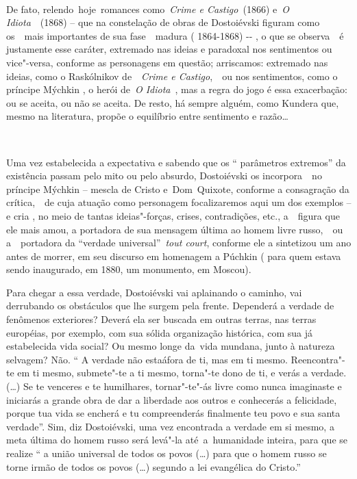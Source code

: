 ~

De fato, relendo~hoje~romances como~\emph{Crime e Castigo~}(1866)
e~\emph{O Idiota}~~(1868) -- que na constelação de obras de Dostoiévski
figuram como os~~mais importantes de sua fase~~madura ( 1864-1868) -\/-
, o que se observa~~é justamente esse caráter, extremado nas ideias e
paradoxal nos sentimentos ou vice"-versa, conforme as personagens em
questão; arriscamos: extremado nas ideias, como o Raskólnikov
de~~\emph{Crime e Castigo},~\emph{~}ou nos sentimentos, como o príncipe
Mýchkin , o herói de~\emph{O Idiota}~, mas a regra do jogo é essa
exacerbação: ou se aceita, ou não se aceita. De resto, há sempre alguém,
como Kundera que, mesmo na literatura, propõe o equilíbrio entre
sentimento e razão\ldots{}

~

Uma vez estabelecida a expectativa e sabendo que os `` parâmetros
extremos'' da existência passam pelo mito ou pelo absurdo, Dostoiévski
os incorpora~~no príncipe Mýchkin -- mescla de Cristo e~Dom~Quixote,
conforme a consagração da crítica,~~de cuja atuação como personagem
focalizaremos aqui um dos exemplos -- e cria , no meio de tantas
ideias"-forças, crises, contradições, etc., a~~figura que ele mais amou,
a portadora de sua mensagem última ao homem livre russo,~~ou
a~~portadora da ``verdade universal''~\emph{tout court}, conforme ele a
sintetizou um ano antes de morrer, em seu discurso em homenagem a
Púchkin ( para quem estava sendo inaugurado, em 1880, um monumento, em
Moscou).

Para chegar a essa verdade, Dostoiévski vai aplainando o caminho, vai
derrubando os obstáculos que lhe surgem pela frente. Dependerá a verdade
de fenômenos exteriores? Deverá ela ser buscada em outras terras, nas
terras européias, por exemplo, com sua sólida organização histórica, com
sua já estabelecida vida social? Ou mesmo longe da~vida mundana, junto à
natureza selvagem? Não. `` A verdade não estaáfora de ti, mas em ti
mesmo. Reencontra"-te em ti mesmo, submete"-te a ti mesmo, torna"-te dono
de ti, e verás a verdade. (\ldots{}) Se te venceres e te humilhares,
tornar"-te"-ás livre como nunca imaginaste e iniciarás a grande obra de
dar a liberdade aos outros e conhecerás a felicidade, porque tua vida se
encherá e tu compreenderás finalmente teu povo e sua santa verdade''.
Sim, diz Dostoiévski, uma vez encontrada a verdade em si mesmo, a meta
última do homem russo será levá"-la até~a~humanidade inteira, para que se
realize `` a união universal de todos os povos (\ldots{}) para que o homem
russo se torne irmão de todos os povos (\ldots{}) segundo a lei evangélica do
Cristo.''


